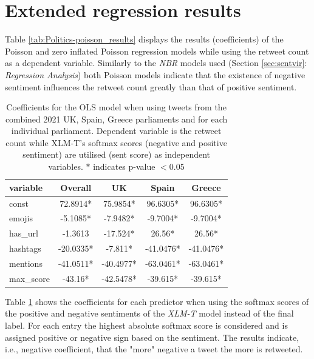 \section{Extended regression results}
Table \ref{tab:Politics-poisson_results} displays the results (coefficients) of the Poisson and zero inflated Poisson regression models while using the retweet count as a dependent variable. Similarly to the \textit{NBR} models used (Section \ref{sec:sentvir}: \textit{Regression Analysis}) both Poisson models indicate that the existence of negative sentiment influences the retweet count greatly than that of positive sentiment.

\begin{table}[hbp!]
\centering
\begin{tabular}{|l|c|c|c|c|}
\hline
\textbf{variable} & \textbf{Overall} & \textbf{UK} & \textbf{Spain} & \textbf{Greece} \\ \hline
const             & 72.8914*         & 75.9854*    & 96.6305*       & 96.6305*        \\ \hline
emojis            & -5.1085*         & -7.9482*    & -9.7004*       & -9.7004*        \\ \hline
has\_url          & -1.3613          & -17.524*    & 26.56*         & 26.56*          \\ \hline
hashtags          & -20.0335*        & -7.811*     & -41.0476*      & -41.0476*       \\ \hline
mentions          & -41.0511*        & -40.4977*   & -63.0461*      & -63.0461*       \\ \hline
max\_score        & -43.16*          & -42.5478*   & -39.615*       & -39.615*        \\ \hline
\end{tabular}
\caption{Coefficients for the OLS model when using tweets from the combined 2021 UK, Spain, Greece parliaments and for each individual parliament. Dependent variable is the retweet count while XLM-T's softmax scores (negative and positive sentiment) are utilised (sent score) as independent variables.  $*$ indicates p-value $< 0.05$ }
\label{tab:Politics-ols_results}
\end{table}

Table \ref{tab:Politics-ols_results} shows the coefficients for each predictor when using the softmax scores of the positive and negative sentiments of the \textit{XLM-T} model instead of the final label. For each entry the highest absolute softmax score is considered and is assigned positive or negative sign based on the sentiment. The results indicate, i.e., negative coefficient, that the "more" negative a tweet the more is retweeted.



